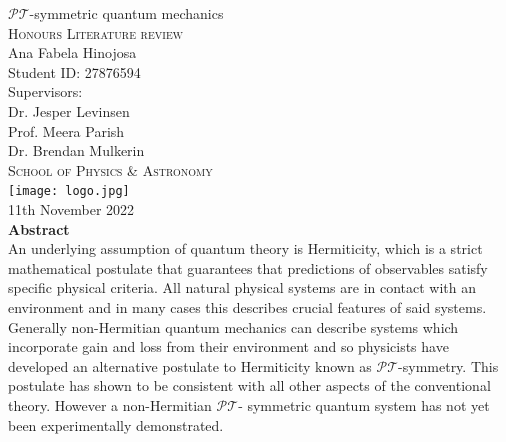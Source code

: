 \documentclass[12pt, a4paper]{report}
\newcommand\PT{\(\mathcal{PT}\)}
\begin{document}
  \begin{center}
  \vspace{2cm}
  {\Huge \( \mathcal{PT} \)-symmetric quantum mechanics}\\
  \vspace{0.5cm}
  \textsc{Honours Literature review}\\
  \vspace{1cm}
  {\Large Ana Fabela Hinojosa\\Student ID: 27876594}\\
  \vspace{0.5cm}
  {\Large Supervisors:\\ Dr. Jesper Levinsen \\ Prof. Meera Parish\\\vspace{0.2cm}Dr. Brendan Mulkerin}\\
  \vspace{0.5cm}
  \textsc{School of Physics \& Astronomy}\\
  \vspace{0.5cm}
  \texttt{[image: logo.jpg]} \\ %
  {11th November 2022}\\
  \vspace{3cm}
  \textbf{Abstract}\\
 An underlying assumption of quantum theory is Hermiticity, which is a strict mathematical postulate that guarantees that predictions of observables satisfy specific physical criteria. All natural physical systems are in contact with an environment and in many cases this describes crucial features of said systems. Generally non-Hermitian quantum mechanics can describe systems which incorporate gain and loss from their environment and so physicists have developed an alternative postulate to Hermiticity known as \PT-symmetry. This postulate has shown to be consistent with all other aspects of the conventional theory. However a non-Hermitian \PT- symmetric quantum system has not yet been experimentally demonstrated.
  \end{center}


\tableofcontents

\end{document}
